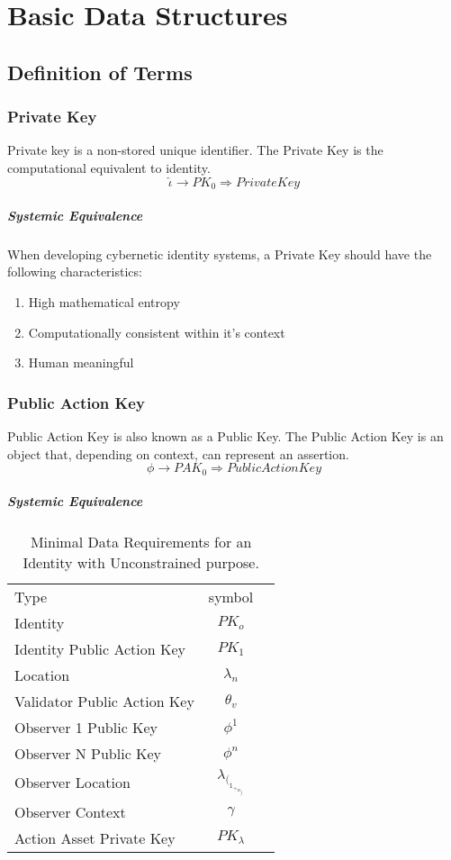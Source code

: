\documentclass{article}
\begin{document}
\section{Basic Data Structures}
\subsection{Definition of Terms}
	\subsubsection{Private Key}	
		Private key is a non-stored unique identifier.  The Private Key is the computational equivalent to identity.
		\begin{equation}
			\hat \iota \rightarrow PK_0 \Rightarrow Private Key
		\end{equation}
	\subparagraph{Systemic Equivalence}
		When developing cybernetic identity systems, a Private Key should have the following characteristics:
\begin{enumerate}
			\item {High mathematical entropy}
			\item {Computationally consistent within it's context}
			\item {Human meaningful}
\end{enumerate}
	\subsubsection{Public Action Key}
		Public Action Key is also known as a Public Key. The Public Action Key is an object that, depending on context, can represent an assertion.
		\begin{equation}
			\phi \rightarrow PAK_0 \Rightarrow Public Action Key
		\end{equation}
	\subparagraph{Systemic Equivalence}

\begin{table}[!th]
\begin{tabular}{|l|c|r|}
\hline
Type & symbol\\
Identity & $PK_o$\\
Identity Public Action Key & $PK_1$\\
Location & $\lambda_n$\\
Validator Public Action Key & $\theta_v$\\
Observer 1 Public Key & $\phi^1$\\
Observer N Public Key & $\phi^n$\\
Observer Location & $\lambda_(_1_+_n_)$\\
Observer Context & $\gamma$\\
Action Asset Private Key & $PK_\lambda$\\
\hline
\end{tabular}
\caption{Minimal Data Requirements for an Identity with Unconstrained purpose.}
\label {Table1}
\end{table}
\end{document}
